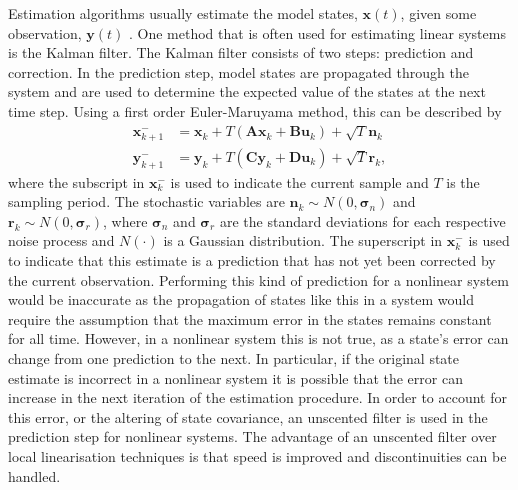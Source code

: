 Estimation algorithms usually estimate the model states, $\mathbf{x}(t)$, given some observation, $\mathbf{y}(t)$ . One method that is often used for estimating linear systems is the Kalman filter. The Kalman filter consists of two steps: prediction and correction. In the prediction step, model states are propagated through the system and are used to determine the expected value of the states at the next time step. Using a first order Euler-Maruyama method, this can be described by \begin{align}
\label{eqn: StateProgL}
\mathbf{x}_{k+1}^{-} &= \mathbf{x}_{k} + T(\mathbf{A}\mathbf{x}_{k} +\mathbf{B}\mathbf{u}_{k})+\sqrt{T}\mathbf{n}_{k}\\
\label{eqn: YProp}
\mathbf{y}_{k+1}^{-}  &= \mathbf{y}_{k} + T(\mathbf{C}\mathbf{y}_{k}+\mathbf{D}\mathbf{u}_{k}) +\sqrt{T}\mathbf{r}_{k},
\end{align} where the subscript in $\mathbf{x}_{k}^{-}$ is used to indicate the current sample and $T$ is the sampling period. The stochastic variables are $\mathbf{n}_{k}\sim N(0,\mathbf{\sigma}_{n})$ and $\mathbf{r}_{k}\sim N(0,\mathbf{\sigma}_{r})$, where $\mathbf{\sigma}_{n}$ and $\mathbf{\sigma}_r$ are the standard deviations for each respective noise process and $N(\cdot)$ is a Gaussian distribution. The superscript in $\mathbf{x}_{k}^{-}$ is used to indicate that this estimate is a prediction that has not yet been corrected by the current observation. Performing this kind of prediction for a nonlinear system would be inaccurate as the propagation of states like this in a system would require the assumption that the maximum error in the states remains constant for all time. However, in a nonlinear system this is not true, as a state's error can change from one prediction to the next. In particular, if the original state estimate is incorrect in a nonlinear system it is possible that the error can increase in the next iteration of the estimation procedure. In order to account for this error, or the altering of state covariance, an unscented filter is used in the prediction step for nonlinear systems. The advantage of an unscented filter over local linearisation techniques is that speed is improved and discontinuities can be handled. 

